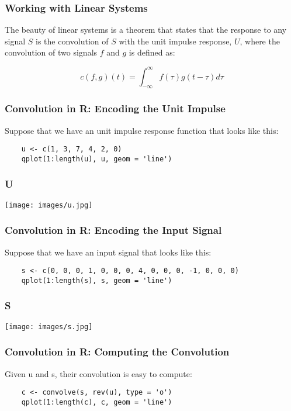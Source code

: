 \documentclass{beamer}
\begin{document}
\frame
{
	\frametitle{Working with Linear Systems}
	
	The beauty of linear systems is a theorem that states that the response to any signal $S$ is the convolution of $S$ with the unit impulse response, $U$, where the convolution of two signals $f$ and $g$ is defined as:
	
	\[
		c(f, g)(t) = \int_{- \infty}^{\infty} f(\tau)g(t - \tau) d\tau 
	\]
}

\begin{frame}[fragile]
	\frametitle{Convolution in R: Encoding the Unit Impulse}
	
	Suppose that we have an unit impulse response function that looks like this:
	
	\begin{verbatim}
	u <- c(1, 3, 7, 4, 2, 0)
	qplot(1:length(u), u, geom = 'line')
	\end{verbatim}
\end{frame}

\frame
{
  \frametitle{U}
  
  \begin{center}
    \texttt{[image: images/u.jpg]}
  \end{center}
}

\begin{frame}[fragile]
	\frametitle{Convolution in R: Encoding the Input Signal}
	
	Suppose that we have an input signal that looks like this:
	\begin{verbatim}
	s <- c(0, 0, 0, 1, 0, 0, 0, 4, 0, 0, 0, -1, 0, 0, 0)
	qplot(1:length(s), s, geom = 'line')
	\end{verbatim}
\end{frame}

\frame
{
  \frametitle{S}
  
  \begin{center}
    \texttt{[image: images/s.jpg]}
  \end{center}
}

\begin{frame}[fragile]
	\frametitle{Convolution in R: Computing the Convolution}
	
	Given u and s, their convolution is easy to compute:
	
	\begin{verbatim}
	c <- convolve(s, rev(u), type = 'o')
	qplot(1:length(c), c, geom = 'line')
	\end{verbatim}
\end{frame}
\end{document}
